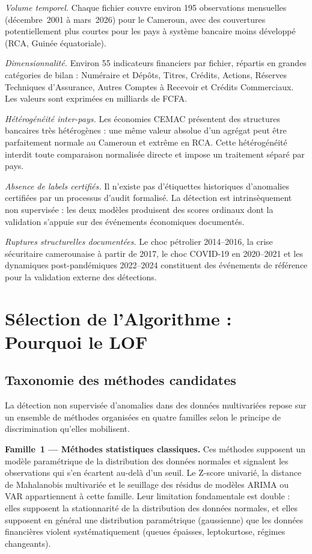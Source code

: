 \documentclass[12pt,a4paper]{article}
\begin{document}
\textit{Volume temporel.} Chaque fichier couvre environ 195 observations
mensuelles (décembre~2001 à mars~2026) pour le Cameroun, avec des couvertures
potentiellement plus courtes pour les pays à système bancaire moins développé
(RCA, Guinée équatoriale).

\textit{Dimensionnalité.} Environ 55 indicateurs financiers par fichier,
répartis en grandes catégories de bilan : Numéraire et Dépôts, Titres,
Crédits, Actions, Réserves Techniques d'Assurance, Autres Comptes à Recevoir
et Crédits Commerciaux. Les valeurs sont exprimées en milliards de FCFA.

\textit{Hétérogénéité inter-pays.} Les économies CEMAC présentent des
structures bancaires très hétérogènes : une même valeur absolue d'un agrégat
peut être parfaitement normale au Cameroun et extrême en RCA. Cette
hétérogénéité interdit toute comparaison normalisée directe et impose un
traitement séparé par pays.

\textit{Absence de labels certifiés.} Il n'existe pas d'étiquettes historiques
d'anomalies certifiées par un processus d'audit formalisé. La détection est
intrinsèquement non supervisée : les deux modèles produisent des scores
ordinaux dont la validation s'appuie sur des événements économiques documentés.

\textit{Ruptures structurelles documentées.} Le choc pétrolier 2014--2016,
la crise sécuritaire camerounaise à partir de 2017, le choc COVID-19 en
2020--2021 et les dynamiques post-pandémiques 2022--2024 constituent des
événements de référence pour la validation externe des détections.

\section{Sélection de l'Algorithme : Pourquoi le LOF}

\subsection{Taxonomie des méthodes candidates}

La détection non supervisée d'anomalies dans des données multivariées repose
sur un ensemble de méthodes organisées en quatre familles selon le principe
de discrimination qu'elles mobilisent.

\textbf{Famille~1 --- Méthodes statistiques classiques.} Ces méthodes
supposent un modèle paramétrique de la distribution des données normales et
signalent les observations qui s'en écartent au-delà d'un seuil. Le
Z-score univarié, la distance de Mahalanobis multivariée et le seuillage
des résidus de modèles ARIMA ou VAR appartiennent à cette famille. Leur
limitation fondamentale est double : elles supposent la stationnarité de la
distribution des données normales, et elles supposent en général une
distribution paramétrique (gaussienne) que les données financières violent
systématiquement (queues épaisses, leptokurtose, régimes changeants).
\end{document}

